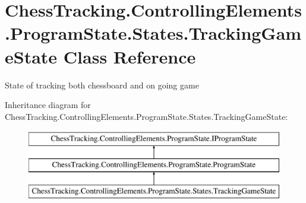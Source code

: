 \hypertarget{class_chess_tracking_1_1_controlling_elements_1_1_program_state_1_1_states_1_1_tracking_game_state}{}\section{Chess\+Tracking.\+Controlling\+Elements.\+Program\+State.\+States.\+Tracking\+Game\+State Class Reference}
\label{class_chess_tracking_1_1_controlling_elements_1_1_program_state_1_1_states_1_1_tracking_game_state}


State of tracking both chessboard and on going game  


Inheritance diagram for Chess\+Tracking.\+Controlling\+Elements.\+Program\+State.\+States.\+Tracking\+Game\+State\+:\begin{figure}[H]
\begin{center}
\leavevmode
\includegraphics[height=3.000000cm]{class_chess_tracking_1_1_controlling_elements_1_1_program_state_1_1_states_1_1_tracking_game_state}
\end{center}
\end{figure}
